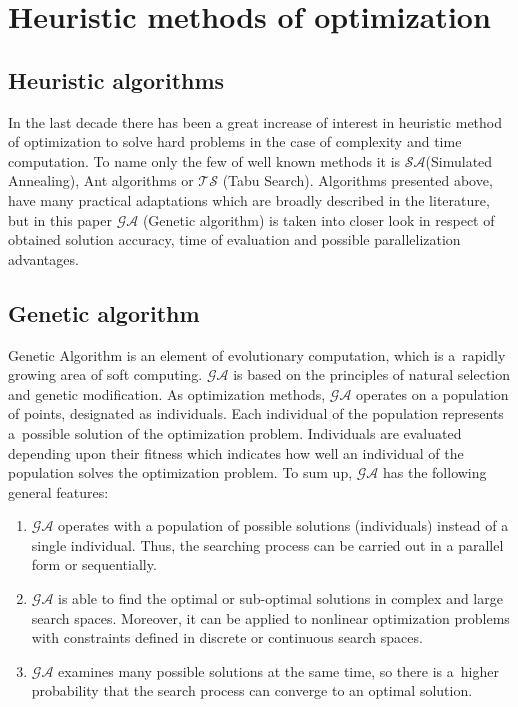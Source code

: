\section{Heuristic methods of optimization }
\label{cha:Introduction}
\subsection{Heuristic algorithms}
\label{cha:HeurysticAlgorithms}
In the last decade there has been a great increase of interest in heuristic
method of optimization to solve hard problems in the case of complexity and time computation.
To name only the few of well known methods it is $\mathcal{SA}$(Simulated
Annealing), Ant algorithms or $\mathcal{TS}$ (Tabu Search). Algorithms presented
above, have many practical adaptations which are broadly described in the literature, 
but in this paper $\mathcal{GA}$ (Genetic algorithm) is taken into closer look
in respect of obtained solution accuracy, time of evaluation and possible parallelization advantages.

\subsection{Genetic algorithm}
\label{cha:GeneticAlgorithm}
Genetic Algorithm is an element of evolutionary computation, which is a~rapidly 
growing area of soft computing. $\mathcal{GA}$ is based on the principles of natural selection 
and genetic modification. As optimization methods, $\mathcal{GA}$ operates on a population of points, 
designated as individuals. Each individual of the population represents a~possible 
solution of the optimization problem. Individuals are evaluated depending upon 
their fitness which indicates how well an individual of the population 
solves the optimization problem. To sum up, $\mathcal{GA}$ has the following general 
features:
\begin{enumerate}
\item $\mathcal{GA}$ operates with a population of possible solutions (individuals) 
instead of a single individual. Thus, the searching process can be carried out in a
parallel form or sequentially. 
\item $\mathcal{GA}$ is able to find the optimal or sub-optimal solutions in complex and large search 
spaces. Moreover, it can be applied to nonlinear optimization problems with 
constraints defined in discrete or continuous search spaces. 
\item $\mathcal{GA}$ examines many possible solutions at the same time, so there is a~higher probability
that the search process can converge to an optimal solution. 
\end{enumerate}

